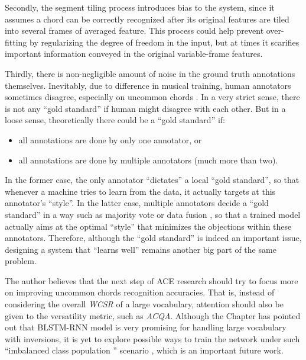 Secondly, the segment tiling process introduces bias to the system, since it assumes a chord can be correctly recognized after its original features are tiled into several frames of averaged feature. This process could help prevent over-fitting by regularizing the degree of freedom in the input, but at times it scarifies important information conveyed in the original variable-frame features.

Thirdly, there is non-negligible amount of noise in the ground truth annotations themselves. Inevitably, due to difference in musical training, human annotators sometimes disagree, especially on uncommon chords \cite{humphreyfour}. In a very strict sense, there is not any ``gold standard'' if human might disagree with each other. But in a loose sense, theoretically there could be a ``gold standard'' if:
\begin{itemize}
	\item all annotations are done by only one annotator, or
	\item all annotations are done by multiple annotators (much more than two).
\end{itemize}
In the former case, the only annotator ``dictates'' a local ``gold standard'', so that whenever a machine tries to learn from the data, it actually targets at this annotator's ``style''. In the latter case, multiple annotators decide a ``gold standard'' in a way such as majority vote or data fusion \cite{koopsintegration,klein2004sensor}, so that a trained model actually aims at the optimal ``style'' that minimizes the objections within these annotators. Therefore, although the ``gold standard'' is indeed an important issue, designing a system that ``learns well'' remains another big part of the same problem.

The author believes that the next step of ACE research should try to focus more on improving uncommon chords recognition accuracies. That is, instead of considering the overall \textit{WCSR} of a large vocabulary, attention should also be given to the versatility metric, such as \textit{ACQA}. Although the Chapter has pointed out that BLSTM-RNN model is very promising for handling large vocabulary with inversions, it is yet to explore possible ways to train the network under such ``imbalanced class population '' scenario \cite{chawla2004editorial}, which is an important future work.


